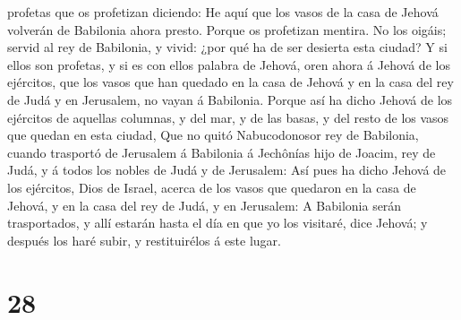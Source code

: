 profetas que os profetizan diciendo: He aquí que los vasos de la casa de
Jehová volverán de Babilonia ahora presto. Porque os profetizan mentira.
 No los oigáis; servid al rey de Babilonia, y vivid: ¿por
qué ha de ser desierta esta ciudad?  Y si ellos son
profetas, y si es con ellos palabra de Jehová, oren ahora á Jehová de
los ejércitos, que los vasos que han quedado en la casa de Jehová y en
la casa del rey de Judá y en Jerusalem, no vayan á Babilonia.
 Porque así ha dicho Jehová de los ejércitos de aquellas
columnas, y del mar, y de las basas, y del resto de los vasos que quedan
en esta ciudad,  Que no quitó Nabucodonosor rey de
Babilonia, cuando trasportó de Jerusalem á Babilonia á Jechônías hijo de
Joacim, rey de Judá, y á todos los nobles de Judá y de Jerusalem:
 Así pues ha dicho Jehová de los ejércitos, Dios de Israel,
acerca de los vasos que quedaron en la casa de Jehová, y en la casa del
rey de Judá, y en Jerusalem:  A Babilonia serán
trasportados, y allí estarán hasta el día en que yo los visitaré, dice
Jehová; y después los haré subir, y restituirélos á este lugar.

\hypertarget{section-27}{%
\section{28}\label{section-27}}

